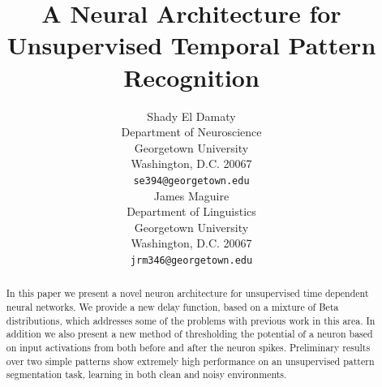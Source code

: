 \documentclass{article}
\title{A Neural Architecture for Unsupervised Temporal Pattern Recognition}
\author{
  Shady El Damaty \\
  Department of Neuroscience\\
  Georgetown University\\
  Washington, D.C. 20067 \\
  \texttt{se394@georgetown.edu} \\
  \And
  James Maguire \\
  Department of Linguistics \\
  Georgetown University \\
  Washington, D.C. 20067\\
  \texttt{jrm346@georgetown.edu} \\
}
\begin{document}
\maketitle
\begin{abstract}
In this paper we present a novel neuron architecture for unsupervised time dependent neural networks. We provide a new delay function, based on a mixture of Beta distributions, which addresses some of the problems with previous work in this area. In addition we also present a new method of thresholding the potential of a neuron based on input activations from both before and after the neuron spikes. Preliminary results over two simple patterns show extremely high performance on an unsupervised pattern segmentation task, learning in both clean and noisy environments.   
\end{abstract}
\end{document}
